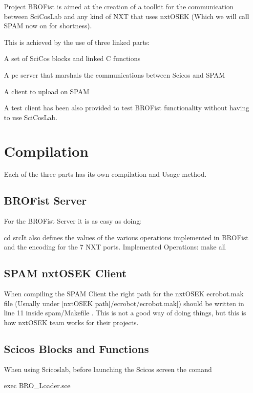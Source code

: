 Project BROFist is aimed at the creation of a toolkit for the communication between SciCosLab and any kind of NXT that uses nxtOSEK (Which we will call \label{main_SPAM}
\hypertarget{main_SPAM}{}
 SPAM now on for shortness).

This is achieved by the use of three linked parts:


\begin{DoxyItemize}
\item A set of SciCos blocks and linked C functions
\item A pc server that marshals the communications between Scicos and SPAM
\item A client to upload on SPAM
\end{DoxyItemize}

A test client has been also provided to test BROFist functionality without having to use SciCosLab.\hypertarget{main_Compile}{}\section{Compilation}\label{main_Compile}
Each of the three parts has its own compilation and Usage method.\hypertarget{main_BROServer}{}\subsection{BROFist Server}\label{main_BROServer}
For the BROFist Server it is as easy as doing: \begin{DoxyVerb}
cd srcIt also defines the values of the various operations implemented in BROFist and the encoding for the 7 NXT ports.
Implemented Operations:
make all
\end{DoxyVerb}
 \hypertarget{main_SPAMClient}{}\subsection{SPAM nxtOSEK Client}\label{main_SPAMClient}
When compiling the SPAM Client the right path for the nxtOSEK {\ttfamily ecrobot.mak} file (Usually under \mbox{[}nxtOSEK path\mbox{]}/ecrobot/ecrobot.mak\mbox{]}) should be written in line 11 inside spam/Makefile . This is not a good way of doing things, but this is how nxtOSEK team works for their projects.\hypertarget{main_ScicosBlocks}{}\subsection{Scicos Blocks and Functions}\label{main_ScicosBlocks}
When using Scicoslab, before launching the Scicos screen the comand \begin{DoxyVerb}
exec BRO_Loader.sce
\end{DoxyVerb}
